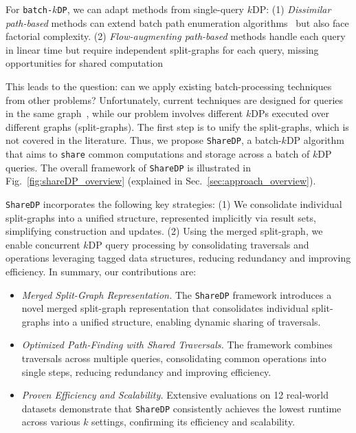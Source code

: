For \texttt{batch-$k$DP}, we can adapt methods from single-query $k$DP: 
(1) \emph{Dissimilar path-based} methods can extend batch path enumeration algorithms~\cite{BatchEnum} but also face factorial complexity. 
(2) \emph{Flow-augmenting path-based} methods handle each query in linear time but require independent split-graphs for each query, missing opportunities for shared computation 

This leads to the question: can we apply existing batch-processing techniques from other problems? 
Unfortunately, current techniques are designed for queries in the same graph~\cite{BatchEnum, tods21subgraphiso, icde20shortestpath, msbfs}, while our problem involves different $k$DPs executed over different graphs (split-graphs). 
The first step is to unify the split-graphs, which is not covered in the literature. 
Thus, we propose \texttt{ShareDP}, a batch-$k$DP algorithm that aims to \texttt{share} common computations and storage across a batch of $k$DP queries. 
The overall framework of \texttt{ShareDP} is illustrated in Fig.~\ref{fig:shareDP_overview} (explained in Sec.~\ref{sec:approach_overview}).

\texttt{ShareDP} incorporates the following key strategies:
(1) We consolidate individual split-graphs into a unified structure, represented implicitly via result sets, simplifying construction and updates.
(2) Using the merged split-graph, we enable concurrent $k$DP query processing by consolidating traversals and operations leveraging tagged data structures, reducing redundancy and improving efficiency.
In summary, our contributions are:

\begin{itemize}[]
\item \emph{Merged Split-Graph Representation.} 
The \texttt{ShareDP} framework introduces a novel merged split-graph representation that consolidates individual split-graphs into a unified structure, enabling dynamic sharing of traversals.

\item \emph{Optimized Path-Finding with Shared Traversals.} 
The framework combines traversals across multiple queries, consolidating common operations into single steps, reducing redundancy and improving efficiency.

\item \emph{Proven Efficiency and Scalability.}  
Extensive evaluations on 12 real-world datasets demonstrate that \texttt{ShareDP} consistently achieves the lowest runtime across various \( k \) settings, confirming its efficiency and scalability.
\end{itemize}


